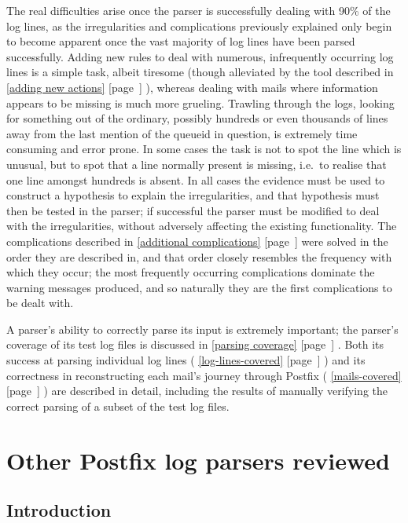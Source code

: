 \documentclass[a4paper,12pt,draft]{article}
\newcommand{\refwithpage}[1]{%
    \empty{}\ref{#1} [page~\pageref{#1}]%
}
\newcommand{\sectionref}[1]{%
    \textsection{}\refwithpage{#1}%
}
\begin{document}
The real difficulties arise once the parser is successfully dealing with
90\% of the log lines, as the irregularities and complications previously
explained only begin to become apparent once the vast majority of log lines
have been parsed successfully.  Adding new rules to deal with numerous,
infrequently occurring log lines is a simple task, albeit tiresome (though
alleviated by the tool described in \sectionref{adding new actions}),
whereas dealing with mails where information appears to be missing is much
more grueling.  Trawling through the logs, looking for something out of the
ordinary, possibly hundreds or even thousands of lines away from the last
mention of the queueid in question, is extremely time consuming and error
prone.  In some cases the task is not to spot the line which is unusual,
but to spot that a line normally present is missing, i.e.\ to realise that
one line amongst hundreds is absent.  In all cases the evidence must be
used to construct a hypothesis to explain the irregularities, and that
hypothesis must then be tested in the parser; if successful the parser must
be modified to deal with the irregularities, without adversely affecting
the existing functionality.  The complications described in
\sectionref{additional complications} were solved in the order they are
described in, and that order closely resembles the frequency with which
they occur; the most frequently occurring complications dominate the
warning messages produced, and so naturally they are the first
complications to be dealt with.

A parser's ability to correctly parse its input is extremely important; the
parser's coverage of its test log files is discussed in \sectionref{parsing
coverage}.  Both its success at parsing individual log lines
(\sectionref{log-lines-covered}) and its correctness in reconstructing each
mail's journey through Postfix (\sectionref{mails-covered}) are described
in detail, including the results of manually verifying the correct parsing
of a subset of the test log files.

\newpage

\appendix


\section{Other Postfix log parsers reviewed}

\label{other-parsers}

\subsection{Introduction}
\end{document}
